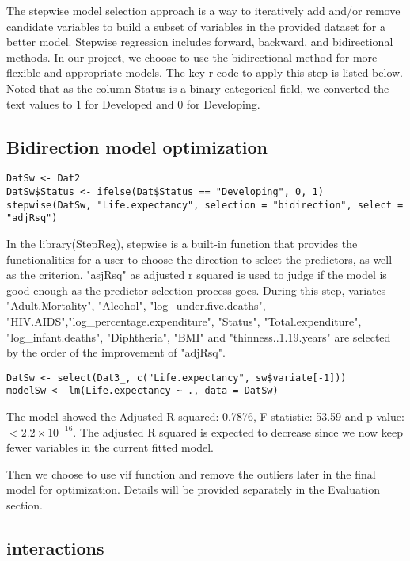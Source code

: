 The stepwise model selection approach is a way to iteratively add and/or remove candidate variables to build a subset of variables in the provided dataset for a better model. Stepwise regression includes forward, backward, and bidirectional methods. In our project, we choose to use the bidirectional method for more flexible and appropriate models. The key r code to apply this step is listed below. Noted that as the column Status is a binary categorical field, we converted the text values to 1 for Developed and 0 for Developing.

\subsection{Bidirection model optimization}

\begin{verbatim}
DatSw <- Dat2
DatSw$Status <- ifelse(Dat$Status == "Developing", 0, 1)
stepwise(DatSw, "Life.expectancy", selection = "bidirection", select = "adjRsq")
\end{verbatim}

In the library(StepReg), stepwise is a built-in function that provides the functionalities for a user to choose the direction to select the predictors, as well as the criterion. "asjRsq" as adjusted r squared is used to judge if the model is good enough as the predictor selection process goes. During this step, variates "Adult.Mortality", "Alcohol", "log\_under.five.deaths", "HIV.AIDS","log\_percentage.expenditure", "Status", "Total.expenditure", "log\_infant.deaths", "Diphtheria", "BMI" and "thinness..1.19.years" are selected by the order of the improvement of "adjRsq".

\begin{verbatim}
DatSw <- select(Dat3_, c("Life.expectancy", sw$variate[-1]))
modelSw <- lm(Life.expectancy ~ ., data = DatSw)
\end{verbatim}

The model showed the Adjusted R-squared:  0.7876, F-statistic: 53.59 and p-value: $< 2.2\times 10^{-16}$. The adjusted R squared is expected to decrease since we now keep fewer variables in the current fitted model.

Then we choose to use vif function and remove the outliers later in the final model for optimization. Details will be provided separately in the Evaluation section. 

\subsection{interactions}

